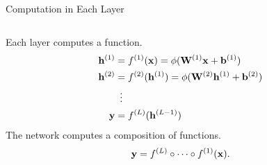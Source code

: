 \documentclass[handout,aspectratio=169]{beamer}
\begin{document}
\begin{frame}{Computation in Each Layer}
\medskip 

\begin{columns}
\begin{column}{0.75\linewidth}

Each layer computes a function.
\begin{align*}
          \mathbf{h}^{(1)} &= f^{(1)}({\bf x}) = \phi(\mathbf{W}^{(1)} {\bf x} + \mathbf{b}^{(1)}) \\
          \mathbf{h}^{(2)} &= f^{(2)}(\mathbf{h}^{(1)}) = \phi(\mathbf{W}^{(2)} \mathbf{h}^{(1)} + \mathbf{b}^{(2)})\\
                       & \hspace{0.5em} \vdots \\
          \mathbf{y} &= f^{(L)}(\mathbf{h}^{(L-1)})
\end{align*}
\bigskip
\pause 
The network computes a composition of functions.\\[-7mm]
        \[ \mathbf{y} = f^{(L)} \circ \cdots \circ f^{(1)}({\bf x}). \]

\bigskip


\end{column}
\end{columns}
\end{frame}
\end{document}
